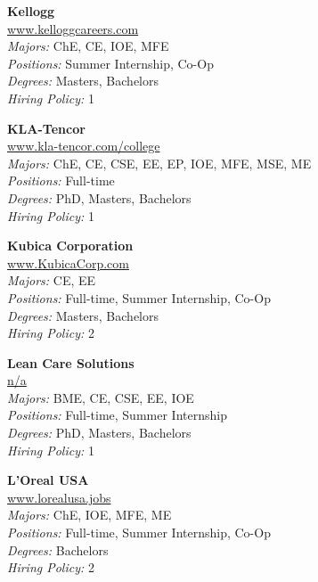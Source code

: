 \documentclass[twoside]{article}
\begin{document}
\begin{center}
\begin{multicols}{3}
\begin{minipage}{.9\columnwidth}{\Large\bf Kellogg }\\
	\url{www.kelloggcareers.com}\\
	\emph{Majors:} ChE, CE, IOE, MFE\\
	\emph{Positions:} Summer Internship, Co-Op\\
	\emph{Degrees:} Masters, Bachelors\\
	\emph{Hiring Policy:} 1\\
\end{minipage}
 
\begin{minipage}{.9\columnwidth}{\Large\bf KLA-Tencor }\\
	\url{www.kla-tencor.com/college}\\
	\emph{Majors:} ChE, CE, CSE, EE, EP, IOE, MFE, MSE, ME\\
	\emph{Positions:} Full-time\\
	\emph{Degrees:} PhD, Masters, Bachelors\\
	\emph{Hiring Policy:} 1\\
\end{minipage}
 
\begin{minipage}{.9\columnwidth}{\Large\bf Kubica Corporation }\\
	\url{www.KubicaCorp.com}\\
	\emph{Majors:} CE, EE\\
	\emph{Positions:} Full-time, Summer Internship, Co-Op\\
	\emph{Degrees:} Masters, Bachelors\\
	\emph{Hiring Policy:} 2\\
\end{minipage}
 
\begin{minipage}{.9\columnwidth}{\Large\bf Lean Care Solutions }\\
	\url{n/a}\\
	\emph{Majors:} BME, CE, CSE, EE, IOE\\
	\emph{Positions:} Full-time, Summer Internship\\
	\emph{Degrees:} PhD, Masters, Bachelors\\
	\emph{Hiring Policy:} 1\\
\end{minipage}
 
\begin{minipage}{.9\columnwidth}{\Large\bf L'Oreal USA }\\
	\url{www.lorealusa.jobs}\\
	\emph{Majors:} ChE, IOE, MFE, ME\\
	\emph{Positions:} Full-time, Summer Internship, Co-Op\\
	\emph{Degrees:} Bachelors\\
	\emph{Hiring Policy:} 2\\
\end{minipage}
 

\end{multicols}
\end{center}
\end{document}
